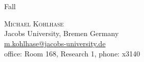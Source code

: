 \documentclass[slides,book,sectocframes]{mikoslides}
\begin{document}
\begin{frame}
  \begin{ttitle}
    \\
    \\
    Fall \the\year
  \end{ttitle}\vspace*{2cm}
  \begin{center}
    \textsc{Michael Kohlhase}\\[1ex]
    Jacobs University,  Bremen Germany\\
    \url{m.kohlhase@jacobs-university.de}\\
    office: Room 168, Research 1, phone: x3140
  \end{center}
\end{frame}

\begin{note}
\end{note}
\end{document}
